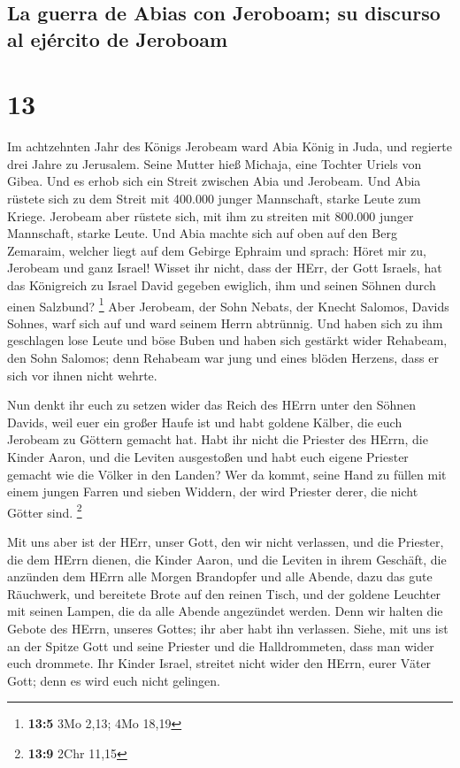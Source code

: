 \hypertarget{la-guerra-de-abias-con-jeroboam-su-discurso-al-ejuxe9rcito-de-jeroboam}{%
\subsection{La guerra de Abias con Jeroboam; su discurso al ejército de
Jeroboam}\label{la-guerra-de-abias-con-jeroboam-su-discurso-al-ejuxe9rcito-de-jeroboam}}

\hypertarget{section-12}{%
\section{13}\label{section-12}}

 Im achtzehnten Jahr des Königs Jerobeam ward Abia König
in Juda,  und regierte drei Jahre zu Jerusalem. Seine
Mutter hieß Michaja, eine Tochter Uriels von Gibea. Und es erhob sich
ein Streit zwischen Abia und Jerobeam.  Und Abia rüstete
sich zu dem Streit mit 400.000 junger Mannschaft, starke Leute zum
Kriege. Jerobeam aber rüstete sich, mit ihm zu streiten mit 800.000
junger Mannschaft, starke Leute.  Und Abia machte sich auf
oben auf den Berg Zemaraim, welcher liegt auf dem Gebirge Ephraim und
sprach: Höret mir zu, Jerobeam und ganz Israel!  Wisset
ihr nicht, dass der HErr, der Gott Israels, hat das Königreich zu Israel
David gegeben ewiglich, ihm und seinen Söhnen durch einen Salzbund?
\footnote{\textbf{13:5} 3Mo 2,13; 4Mo 18,19}  Aber
Jerobeam, der Sohn Nebats, der Knecht Salomos, Davids Sohnes, warf sich
auf und ward seinem Herrn abtrünnig.  Und haben sich zu
ihm geschlagen lose Leute und böse Buben und haben sich gestärkt wider
Rehabeam, den Sohn Salomos; denn Rehabeam war jung und eines blöden
Herzens, dass er sich vor ihnen nicht wehrte.

 Nun denkt ihr euch zu setzen wider das Reich des HErrn
unter den Söhnen Davids, weil euer ein großer Haufe ist und habt goldene
Kälber, die euch Jerobeam zu Göttern gemacht hat.  Habt
ihr nicht die Priester des HErrn, die Kinder Aaron, und die Leviten
ausgestoßen und habt euch eigene Priester gemacht wie die Völker in den
Landen? Wer da kommt, seine Hand zu füllen mit einem jungen Farren und
sieben Widdern, der wird Priester derer, die nicht Götter sind.
\footnote{\textbf{13:9} 2Chr 11,15}

 Mit uns aber ist der HErr, unser Gott, den wir nicht
verlassen, und die Priester, die dem HErrn dienen, die Kinder Aaron, und
die Leviten in ihrem Geschäft,  die anzünden dem HErrn
alle Morgen Brandopfer und alle Abende, dazu das gute Räuchwerk, und
bereitete Brote auf den reinen Tisch, und der goldene Leuchter mit
seinen Lampen, die da alle Abende angezündet werden. Denn wir halten die
Gebote des HErrn, unseres Gottes; ihr aber habt ihn verlassen.
 Siehe, mit uns ist an der Spitze Gott und seine Priester
und die Halldrommeten, dass man wider euch drommete. Ihr Kinder Israel,
streitet nicht wider den HErrn, eurer Väter Gott; denn es wird euch
nicht gelingen.

